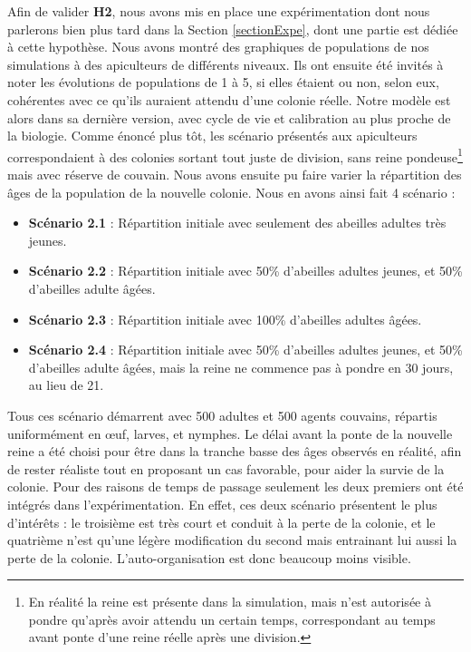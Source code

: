 			Afin de valider \textbf{H2}, nous avons mis en place une expérimentation dont nous parlerons bien plus tard dans la Section \ref{sectionExpe}, dont une partie est dédiée à cette hypothèse. Nous avons montré des graphiques de populations de nos simulations à des apiculteurs de différents niveaux. Ils ont ensuite été invités à noter les évolutions de populations de 1 à 5, si elles étaient ou non, selon eux, cohérentes avec ce qu'ils auraient attendu d'une colonie réelle. Notre modèle est alors dans sa dernière version, avec cycle de vie et calibration au plus proche de la biologie. Comme énoncé plus tôt, les scénario présentés aux apiculteurs correspondaient à des colonies sortant tout juste de division, sans reine pondeuse\footnote{En réalité la reine est présente dans la simulation, mais n'est autorisée à pondre qu'après avoir attendu un certain temps, correspondant au temps avant ponte d'une reine réelle après une division.} mais avec réserve de couvain. Nous avons ensuite pu faire varier la répartition des âges de la population de la nouvelle colonie. Nous en avons ainsi fait 4 scénario :
				\begin{itemize}
					\item \textbf{Scénario 2.1} : Répartition initiale avec seulement des abeilles adultes très jeunes.
					\item \textbf{Scénario 2.2} : Répartition initiale avec 50\% d'abeilles adultes jeunes, et 50\% d'abeilles adulte âgées.
					\item \textbf{Scénario 2.3} : Répartition initiale avec 100\% d'abeilles adultes âgées.
					\item \textbf{Scénario 2.4} : Répartition initiale avec 50\% d'abeilles adultes jeunes, et 50\% d'abeilles adulte âgées, mais la reine ne commence pas à pondre en 30 jours, au lieu de 21.
				\end{itemize}
				
				Tous ces scénario démarrent avec 500 adultes et 500  agents couvains, répartis uniformément en œuf, larves, et nymphes.  Le délai avant la ponte de la nouvelle reine a été choisi pour être dans la tranche basse des âges observés en réalité, afin de rester réaliste tout en proposant un cas favorable, pour aider la survie de la colonie. Pour des raisons de temps de passage seulement les deux premiers ont été intégrés dans l'expérimentation. En effet, ces deux scénario présentent le plus d'intérêts : le troisième est très court et conduit à la perte de la colonie, et le quatrième n'est qu'une légère modification du second mais entrainant lui aussi la perte de la colonie. L'auto-organisation est donc beaucoup moins visible.
				
